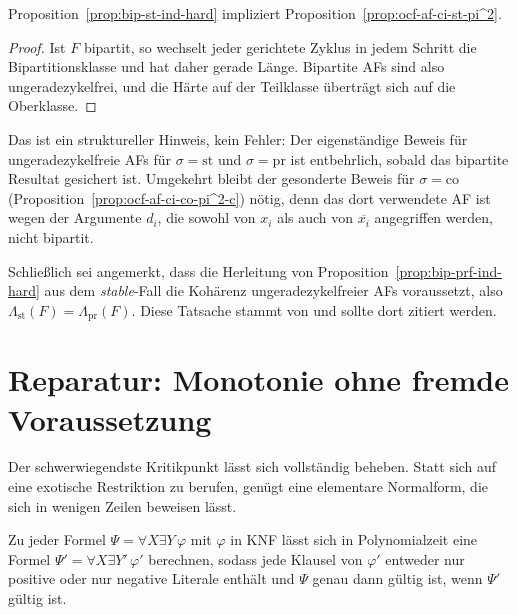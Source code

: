 \begin{Corollary}
    \label{cor:bip-subsumiert-ocf}
    Proposition~\ref{prop:bip-st-ind-hard} impliziert
    Proposition~\ref{prop:ocf-af-ci-st-pi^2}.
\end{Corollary}

\begin{proof}
    Ist \(F\) bipartit, so wechselt jeder gerichtete Zyklus in jedem Schritt die
    Bipartitionsklasse und hat daher gerade Länge. Bipartite AFs sind also
    ungeradezykelfrei, und die Härte auf der Teilklasse überträgt sich auf die
    Oberklasse.
\end{proof}

Das ist ein struktureller Hinweis, kein Fehler: Der eigenständige Beweis für
ungeradezykelfreie AFs für \(\sigma=\mathrm{st}\) und \(\sigma=\mathrm{pr}\) ist
entbehrlich, sobald das bipartite Resultat gesichert ist. Umgekehrt bleibt der
gesonderte Beweis für \(\sigma=\mathrm{co}\)
(Proposition~\ref{prop:ocf-af-ci-co-pi^2-c}) nötig, denn das dort verwendete AF
ist wegen der Argumente \(d_i\), die sowohl von \(x_i\) als auch von
\(\overline{x_i}\) angegriffen werden, nicht bipartit.

Schließlich sei angemerkt, dass die Herleitung von
Proposition~\ref{prop:bip-prf-ind-hard} aus dem \textit{stable}-Fall die
Kohärenz ungeradezykelfreier AFs voraussetzt, also
\(\Lambda_{\mathrm{st}}(F)=\Lambda_{\mathrm{pr}}(F)\). Diese Tatsache stammt von
\textcite{dung:1995:af} und sollte dort zitiert werden.

\section{Reparatur: Monotonie ohne fremde Voraussetzung}
\label{sec:bip-analyse-reparatur}

Der schwerwiegendste Kritikpunkt lässt sich vollständig beheben. Statt sich auf
eine exotische Restriktion zu berufen, genügt eine elementare Normalform, die
sich in wenigen Zeilen beweisen lässt.

\begin{Lemma}
    \label{lem:monotone-normalform}
    Zu jeder Formel \(\Psi=\forall X\exists Y\,\varphi\) mit \(\varphi\) in KNF
    lässt sich in Polynomialzeit eine Formel
    \(\Psi'=\forall X\exists Y'\,\varphi'\) berechnen, sodass jede Klausel von
    \(\varphi'\) entweder nur positive oder nur negative Literale enthält und
    \(\Psi\) genau dann gültig ist, wenn \(\Psi'\) gültig ist.
\end{Lemma}

